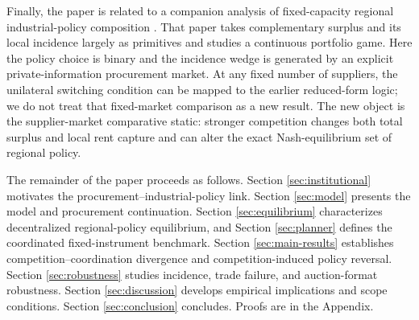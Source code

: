 Finally, the paper is related to a companion analysis of fixed-capacity regional industrial-policy composition \citep{Companion2026}. That paper takes complementary surplus and its local incidence largely as primitives and studies a continuous portfolio game. Here the policy choice is binary and the incidence wedge is generated by an explicit private-information procurement market. At any fixed number of suppliers, the unilateral switching condition can be mapped to the earlier reduced-form logic; we do not treat that fixed-market comparison as a new result. The new object is the supplier-market comparative static: stronger competition changes both total surplus and local rent capture and can alter the exact Nash-equilibrium set of regional policy.

The remainder of the paper proceeds as follows. Section \ref{sec:institutional} motivates the procurement--industrial-policy link. Section \ref{sec:model} presents the model and procurement continuation. Section \ref{sec:equilibrium} characterizes decentralized regional-policy equilibrium, and Section \ref{sec:planner} defines the coordinated fixed-instrument benchmark. Section \ref{sec:main-results} establishes competition--coordination divergence and competition-induced policy reversal. Section \ref{sec:robustness} studies incidence, trade failure, and auction-format robustness. Section \ref{sec:discussion} develops empirical implications and scope conditions. Section \ref{sec:conclusion} concludes. Proofs are in the Appendix.
